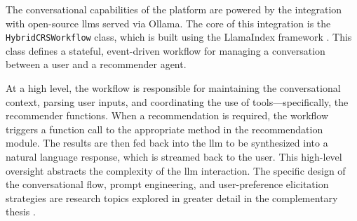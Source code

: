 The conversational capabilities of the platform are powered by the integration with open-source \acp{llm} served via Ollama. The core of this integration is the \texttt{HybridCRSWorkflow} class, which is built using the LlamaIndex framework \cite{LLAMAINDEX}. This class defines a stateful, event-driven workflow for managing a conversation between a user and a recommender agent.

At a high level, the workflow is responsible for maintaining the conversational context, parsing user inputs, and coordinating the use of tools---specifically, the recommender functions. When a recommendation is required, the workflow triggers a function call to the appropriate method in the recommendation module. The results are then fed back into the \ac{llm} to be synthesized into a natural language response, which is streamed back to the user. This high-level oversight abstracts the complexity of the \ac{llm} interaction. The specific design of the conversational flow, prompt engineering, and user-preference elicitation strategies are research topics explored in greater detail in the complementary thesis \cite{MUI2ICSI-THESIS}.